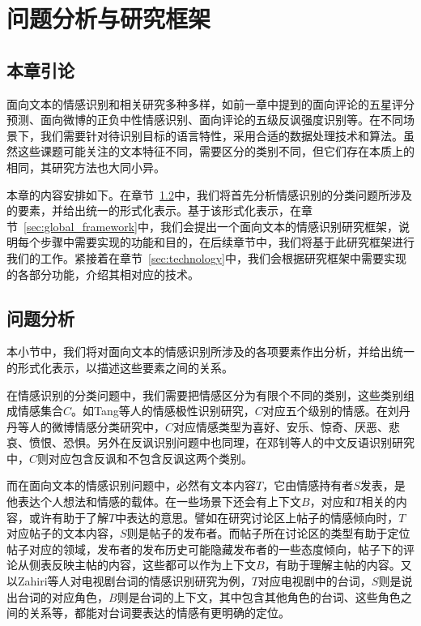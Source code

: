 \chapter{问题分析与研究框架}
\label{cha:problem_framework}

\section{本章引论}

面向文本的情感识别和相关研究多种多样，如前一章中提到的面向评论的五星评分预测、面向微博的正负中性情感识别、面向评论的五级反讽强度识别等。在不同场景下，我们需要针对待识别目标的语言特性，采用合适的数据处理技术和算法。虽然这些课题可能关注的文本特征不同，需要区分的类别不同，但它们存在本质上的相同，其研究方法也大同小异。

本章的内容安排如下。在章节~\ref{sec:global_problem_analysis}中，我们将首先分析情感识别的分类问题所涉及的要素，并给出统一的形式化表示。基于该形式化表示，在章节~\ref{sec:global_framework}中，我们会提出一个面向文本的情感识别研究框架，说明每个步骤中需要实现的功能和目的，在后续章节中，我们将基于此研究框架进行我们的工作。紧接着在章节~\ref{sec:technology}中，我们会根据研究框架中需要实现的各部分功能，介绍其相对应的技术。

\section{问题分析}
\label{sec:global_problem_analysis}

本小节中，我们将对面向文本的情感识别所涉及的各项要素作出分析，并给出统一的形式化表示，以描述这些要素之间的关系。

在情感识别的分类问题中，我们需要把情感区分为有限个不同的类别，这些类别组成情感集合$C$。如Tang等人\cite{tang2015learning}的情感极性识别研究，$C$对应五个级别的情感。在刘丹丹等人\cite{刘丹丹2015基于}的微博情感分类研究中，$C$对应情感类型为喜好、安乐、惊奇、厌恶、悲哀、愤恨、恐惧。另外在反讽识别问题中也同理，在邓钊等人\cite{2015面向微博的中文反语识别研究}的中文反语识别研究中，$C$则对应包含反讽和不包含反讽这两个类别。

而在面向文本的情感识别问题中，必然有文本内容$T$，它由情感持有者$S$发表，是他表达个人想法和情感的载体。在一些场景下还会有上下文$B$，对应和$T$相关的内容，或许有助于了解$T$中表达的意思。譬如在研究讨论区上帖子的情感倾向时，$T$对应帖子的文本内容，$S$则是帖子的发布者。而帖子所在讨论区的类型有助于定位帖子对应的领域，发布者的发布历史可能隐藏发布者的一些态度倾向，帖子下的评论从侧表反映主帖的内容，这些都可以作为上下文$B$，有助于理解主帖的内容。又以Zahiri等人\cite{Zahiri2017Emotion}对电视剧台词的情感识别研究为例，$T$对应电视剧中的台词，$S$则是说出台词的对应角色，$B$则是台词的上下文，其中包含其他角色的台词、这些角色之间的关系等，都能对台词要表达的情感有更明确的定位。

